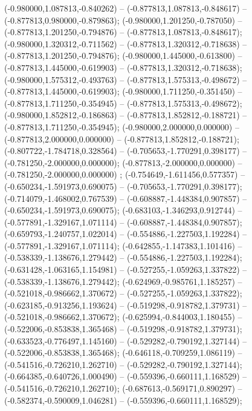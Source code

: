  (-0.980000,1.087813,-0.840262) -- (-0.877813,1.087813,-0.848617) -- (-0.877813,0.980000,-0.879863);
 (-0.980000,1.201250,-0.787050) -- (-0.877813,1.201250,-0.794876) -- (-0.877813,1.087813,-0.848617);
 (-0.980000,1.320312,-0.711562) -- (-0.877813,1.320312,-0.718638) -- (-0.877813,1.201250,-0.794876);
 (-0.980000,1.445000,-0.613800) -- (-0.877813,1.445000,-0.619903) -- (-0.877813,1.320312,-0.718638);
 (-0.980000,1.575312,-0.493763) -- (-0.877813,1.575313,-0.498672) -- (-0.877813,1.445000,-0.619903);
 (-0.980000,1.711250,-0.351450) -- (-0.877813,1.711250,-0.354945) -- (-0.877813,1.575313,-0.498672);
 (-0.980000,1.852812,-0.186863) -- (-0.877813,1.852812,-0.188721) -- (-0.877813,1.711250,-0.354945);
 (-0.980000,2.000000,0.000000) -- (-0.877813,2.000000,0.000000) -- (-0.877813,1.852812,-0.188721);
 (-0.807722,-1.784718,0.328564) -- (-0.705653,-1.770291,0.398177) -- (-0.781250,-2.000000,0.000000);
 (-0.877813,-2.000000,0.000000) -- (-0.781250,-2.000000,0.000000) ;
 (-0.754649,-1.611456,0.577357) -- (-0.650234,-1.591973,0.690075) -- (-0.705653,-1.770291,0.398177);
 (-0.714079,-1.468002,0.767539) -- (-0.608887,-1.448384,0.907857) -- (-0.650234,-1.591973,0.690075);
 (-0.683103,-1.346293,0.912744) -- (-0.577891,-1.329167,1.071114) -- (-0.608887,-1.448384,0.907857);
 (-0.659793,-1.240757,1.022014) -- (-0.554886,-1.227503,1.192284) -- (-0.577891,-1.329167,1.071114);
 (-0.642855,-1.147383,1.101416) -- (-0.538339,-1.138676,1.279442) -- (-0.554886,-1.227503,1.192284);
 (-0.631428,-1.063165,1.154981) -- (-0.527255,-1.059263,1.337822) -- (-0.538339,-1.138676,1.279442);
 (-0.624969,-0.985761,1.185257) -- (-0.521018,-0.986662,1.370672) -- (-0.527255,-1.059263,1.337822);
 (-0.623185,-0.913256,1.193624) -- (-0.519298,-0.918782,1.379731) -- (-0.521018,-0.986662,1.370672);
 (-0.625994,-0.844003,1.180455) -- (-0.522006,-0.853838,1.365468) -- (-0.519298,-0.918782,1.379731);
 (-0.633523,-0.776497,1.145160) -- (-0.529282,-0.790192,1.327144) -- (-0.522006,-0.853838,1.365468);
 (-0.646118,-0.709259,1.086119) -- (-0.541516,-0.726210,1.262710) -- (-0.529282,-0.790192,1.327144);
 (-0.664385,-0.640726,1.000490) -- (-0.559396,-0.660111,1.168529) -- (-0.541516,-0.726210,1.262710);
 (-0.687613,-0.569171,0.890297) -- (-0.582374,-0.590009,1.046281) -- (-0.559396,-0.660111,1.168529);
